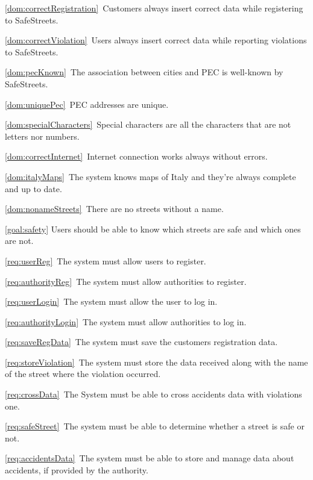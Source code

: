 \begin{description}
\begin{description}
\begin{description}
							\item \ref{dom:correctRegistration}\ Customers always insert correct data while registering to SafeStreets.
							\item \ref{dom:correctViolation}\ Users always insert correct data while reporting violations to SafeStreets.
							\item \ref{dom:pecKnown}\ The association between cities and PEC is well-known by SafeStreets.
							\item \ref{dom:uniquePec}\ PEC addresses are unique.
							\item \ref{dom:specialCharacters}\ Special characters are all the characters that are not letters nor numbers.
							\item \ref{dom:correctInternet}\ Internet connection works always without errors.
							\item \ref{dom:italyMaps}\ The system knows maps of Italy and they’re always complete and up to date.
							\item \ref{dom:nonameStreets}\ There are no streets without a name.
						\end{description}
				\end{description}
			\item \ref{goal:safety} Users should be able to know which streets are safe and which ones are not.
				\begin{description}
					\item \ref{req:userReg}\ The system must allow users to register.
					\item \ref{req:authorityReg}\ The system must allow authorities to register.
					\item \ref{req:userLogin}\ The system must allow the user to log in.
					\item \ref{req:authorityLogin}\ The system must allow authorities to log in.
					\item \ref{req:saveRegData}\ The system must save the customers registration data.
					\item \ref{req:storeViolation}\ The system must store the data received along with the name of the street where the violation occurred.
					\item \ref{req:crossData}\ The System must be able to cross accidents data with violations one.
					\item \ref{req:safeStreet}\ The system must be able to determine whether a street is safe or not.
					\item \ref{req:accidentsData}\ The system must be able to store and manage data about accidents, if provided by the authority.

\end{description}
\end{description}
